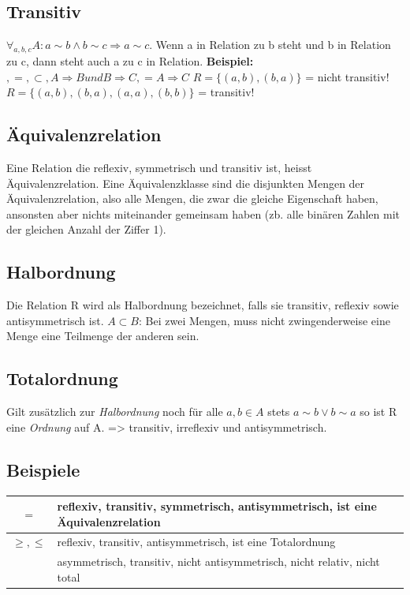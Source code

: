 \subsection{Transitiv}
\( \forall_{a,b,c} A: a \sim b \wedge b \sim c \Rightarrow a \sim c \).
    Wenn a in Relation zu b steht und b in Relation zu c, dann steht auch a
    zu c in Relation.\newline
    \textbf{Beispiel:} \(<,>,=,\subset, A \Rightarrow B und B \Rightarrow
    C, = A \Rightarrow C\)\newline
    \( R = \{(a,b),(b,a) \}\) = nicht transitiv! \newline
    \( R = \{(a,b),(b,a),(a,a),(b,b) \}\) = transitiv!

\subsection{Äquivalenzrelation}
Eine Relation die reflexiv, symmetrisch und transitiv ist, heisst
    Äquivalenzrelation.\newline
    Eine Äquivalenzklasse sind die disjunkten Mengen der Äquivalenzrelation, also alle Mengen, die zwar die gleiche Eigenschaft haben, ansonsten aber nichts miteinander gemeinsam haben (zb. alle binären Zahlen mit der gleichen Anzahl der Ziffer 1).

\subsection{Halbordnung}
Die Relation R wird als Halbordnung bezeichnet, falls sie transitiv,
    reflexiv sowie antisymmetrisch ist.\newline
    \(A \subset B\): Bei zwei Mengen, muss nicht zwingenderweise eine Menge
    eine Teilmenge der anderen sein.

\subsection{Totalordnung}
Gilt zusätzlich zur \emph{Halbordnung} noch für alle \(a,b \in A\)
    stets \(a \sim b \vee b \sim a\) so ist R eine \emph{Ordnung} auf A. =>
    transitiv, irreflexiv und antisymmetrisch.

\subsection{Beispiele} %
\label{sub:beispiele}
\begin{longtable}{c|l}
	\(=\) & reflexiv, transitiv, symmetrisch, antisymmetrisch, ist eine Äquivalenzrelation \\ \hline
	\(\geq,\leq\) & reflexiv, transitiv, antisymmetrisch, ist eine Totalordnung \\ \hline
	\(<,>\) & asymmetrisch, transitiv, nicht antisymmetrisch, nicht relativ, nicht total
\end{longtable}
	
